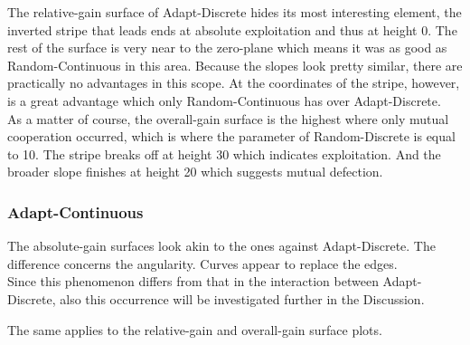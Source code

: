 \documentclass{article}
\begin{document}
		The relative-gain surface of Adapt-Discrete hides its most interesting element, the inverted stripe that leads ends at absolute exploitation and thus at height 0.
		The rest of the surface is very near to the zero-plane which means it was as good as Random-Continuous in this area.
		Because the slopes look pretty similar, there are practically no advantages in this scope.
		At the coordinates of the stripe, however, is a great advantage which only Random-Continuous has over Adapt-Discrete.\\

		As a matter of course, the overall-gain surface is the highest where only mutual cooperation occurred, which is where the parameter of Random-Discrete is equal to 10.
		The stripe breaks off at height 30 which indicates exploitation.
		And the broader slope finishes at height 20 which suggests mutual defection.\\


\subsubsection*{Adapt-Continuous}
		The absolute-gain surfaces look akin to the ones against Adapt-Discrete.
		The difference concerns the angularity.
		Curves appear to replace the edges.\\
		Since this phenomenon differs from that in the interaction between Adapt-Discrete, also this occurrence will be investigated further in the Discussion.
		

		The same applies to the relative-gain and overall-gain surface plots.\\

	
\end{document}
